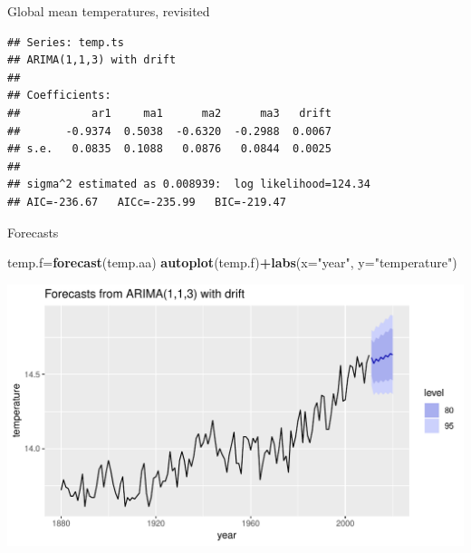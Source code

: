 \documentclass[ignorenonframetext,]{beamer}
\newenvironment{Shaded}{\begin{snugshade}}{\end{snugshade}}
\newcommand{\DataTypeTok}[1]{\textcolor[rgb]{0.13,0.29,0.53}{#1}}
\newcommand{\DecValTok}[1]{\textcolor[rgb]{0.00,0.00,0.81}{#1}}
\newcommand{\KeywordTok}[1]{\textcolor[rgb]{0.13,0.29,0.53}{\textbf{#1}}}
\newcommand{\NormalTok}[1]{#1}
\newcommand{\OperatorTok}[1]{\textcolor[rgb]{0.81,0.36,0.00}{\textbf{#1}}}
\newcommand{\StringTok}[1]{\textcolor[rgb]{0.31,0.60,0.02}{#1}}
\begin{document}
\begin{frame}[fragile]{Global mean temperatures, revisited}
\protect\hypertarget{global-mean-temperatures-revisited}{}

\begin{Shaded}
\end{Shaded}

\begin{verbatim}
## Series: temp.ts 
## ARIMA(1,1,3) with drift 
## 
## Coefficients:
##           ar1     ma1      ma2      ma3   drift
##       -0.9374  0.5038  -0.6320  -0.2988  0.0067
## s.e.   0.0835  0.1088   0.0876   0.0844  0.0025
## 
## sigma^2 estimated as 0.008939:  log likelihood=124.34
## AIC=-236.67   AICc=-235.99   BIC=-219.47
\end{verbatim}

\end{frame}

\begin{frame}[fragile]{Forecasts}
\protect\hypertarget{forecasts}{}

\begin{Shaded}
\begin{Highlighting}[]
\NormalTok{temp.f=}\KeywordTok{forecast}\NormalTok{(temp.aa)}
\KeywordTok{autoplot}\NormalTok{(temp.f)}\OperatorTok{+}\KeywordTok{labs}\NormalTok{(}\DataTypeTok{x=}\StringTok{"year"}\NormalTok{, }\DataTypeTok{y=}\StringTok{"temperature"}\NormalTok{)}
\end{Highlighting}
\end{Shaded}

\includegraphics{figure/unnamed-chunk-68-1.pdf}

\end{frame}
\end{document}
